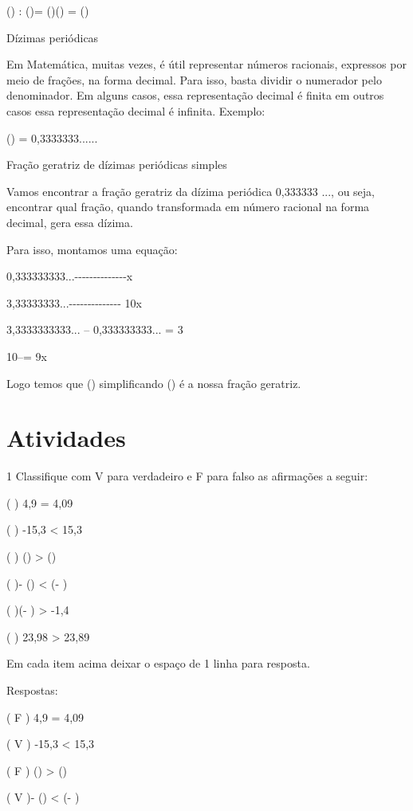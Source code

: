 () : ()= ()\times () =
()

Dízimas periódicas

Em Matemática, muitas vezes, é útil representar números racionais,
expressos por meio de frações, na forma decimal. Para isso, basta
dividir o numerador pelo denominador. Em alguns casos, essa
representação decimal é finita em outros casos essa representação
decimal é infinita. Exemplo:

() = 0,3333333......

Fração geratriz de dízimas periódicas simples

Vamos encontrar a fração geratriz da dízima periódica 0,333333 ..., ou
seja, encontrar qual fração, quando transformada em número racional na
forma decimal, gera essa dízima.

Para isso, montamos uma equação:

0,333333333...-\/-\/-\/-\/-\/-\/-\/-\/-\/-\/-\/-\/-\/-x

3,33333333...-\/-\/-\/-\/-\/-\/-\/-\/-\/-\/-\/-\/-\/- 10x

3,3333333333... -- 0,333333333... = 3

10\times --\times = 9x

Logo temos que () simplificando () é a nossa
fração geratriz.

\section{Atividades}

\num{1} Classifique com V para verdadeiro e F para falso as afirmações a
seguir:

( ) 4,9 = 4,09

( ) -15,3 \textless{} 15,3

( ) () \textgreater{} ()

( )- () \textless{} (- )

( )(- ) \textgreater{} -1,4

( ) 23,98 \textgreater{} 23,89

Em cada item acima deixar o espaço de 1 linha para resposta.

Respostas:

( F ) 4,9 = 4,09

( V ) -15,3 \textless{} 15,3

( F ) () \textgreater{} ()

( V )- () \textless{} (- )

